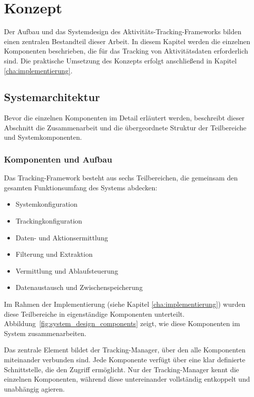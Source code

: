 \chapter{Konzept}
\label{cha:konzept}
Der Aufbau und das Systemdesign des Aktivitäts-Tracking-Frameworks bilden einen zentralen Bestandteil dieser Arbeit. In diesem Kapitel werden die einzelnen Komponenten beschrieben, die für das Tracking von Aktivitätsdaten erforderlich sind. Die praktische Umsetzung des Konzepts erfolgt anschließend in Kapitel \ref{cha:implementierung}.

\section{Systemarchitektur}
Bevor die einzelnen Komponenten im Detail erläutert werden, beschreibt dieser Abschnitt die Zusammenarbeit und die übergeordnete Struktur der Teilbereiche und Systemkomponenten.

\subsection{Komponenten und Aufbau}
\label{sec:system_design}
Das Tracking-Framework besteht aus sechs Teilbereichen, die gemeinsam den gesamten Funktionsumfang des Systems abdecken:

\begin{itemize}
    \item Systemkonfiguration
    \item Trackingkonfiguration
    \item Daten- und Aktionsermittlung
    \item Filterung und Extraktion
    \item Vermittlung und Ablaufsteuerung
    \item Datenaustausch und Zwischenspeicherung
\end{itemize}

Im Rahmen der Implementierung (siehe Kapitel \ref{cha:implementierung}) wurden diese Teilbereiche in eigenständige Komponenten unterteilt. Abbildung~\ref{fig:system_design_components} zeigt, wie diese Komponenten im System zusammenarbeiten.

Das zentrale Element bildet der Tracking-Manager, über den alle Komponenten miteinander verbunden sind. Jede Komponente verfügt über eine klar definierte Schnittstelle, die den Zugriff ermöglicht. Nur der Tracking-Manager kennt die einzelnen Komponenten, während diese untereinander vollständig entkoppelt und unabhängig agieren.

